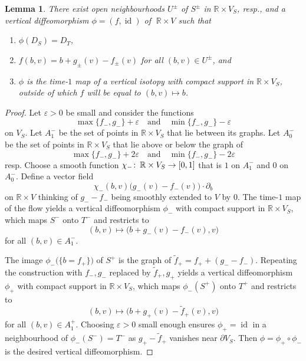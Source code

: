 \documentclass{amsart}
\newtheorem{lem}[prop]{Lemma}
\theoremstyle{definition}
\def\co{\colon\thinspace}
\newcommand{\R}{\mathbb R}
\newcommand{\ra}{\rightarrow}
\DeclareMathOperator{\id}{\mathrm{id}}
\begin{document}
\begin{lem}
\label{lem:verticallydiffeomorphic}
  There exist open neighbourhoods $U^{\pm}\!$ of
  $S^{\pm}$ in $\R\times V_S$, resp.,
  and a vertical diffeomorphism $\phi=(f,\id)$ of
  $\;\R\times V$
  such that
  	\begin{enumerate}
 	\item[(i)]
  		$\phi(D_S)=D_T$,
 	\item[(ii)]
		$f(b,v)=b+g_{\pm}(v)-f_{\pm}(v)$
		for all $(b,v)\in U^{\pm}$, and
 	\item[(iii)]
		$\phi$ is the time-$1$ map of a vertical isotopy
		with compact support in $\R\times V_S$,
		outside of which $f$ will be equal to $(b,v)\mapsto b$.
  	\end{enumerate}
\end{lem}


\begin{proof}
  Let $\varepsilon>0$ be small and consider the functions
  \[
  \max\{f_-,g_-\}+\varepsilon
  \quad\text{and}\quad
  \min\{f_-,g_-\}-\varepsilon
  \]
  on $V_S$.
  Let $A_1^-$ be the set of points in $\R\times V_S$
  that lie between its graphs.
  Let $A_0^-$ be the set of points in $\R\times V_S$
  that lie above or below the graph of
  \[
  \max\{f_-,g_-\}+2\varepsilon
  \quad\text{and}\quad
  \min\{f_-,g_-\}-2\varepsilon
  \]
  resp.
  Choose a smooth function $\chi_-\co\R\times V_S\ra [0,1]$
  that is $1$ on $A_1^-$ and $0$ on $A_0^-$.
  Define a vector field
  \[
  \chi_-(b,v)
  \Big(g_-(v)-f_-(v)\Big)
  \cdot\partial_b
  \]
  on $\R\times V$ thinking of $g_--f_-$ being smoothly extended
  to $V$ by $0$.
  The time-$1$ map of the flow
  yields a vertical diffeomorphism $\phi_-$
  with compact support in $\R\times V_S$,
  which maps $S^-$ onto $T^-$ and restricts to
  \[
  (b,v)\longmapsto\Big(b+g_-(v)-f_-(v),v\Big)
  \]
  for all $(b,v)\in A_1^-$.
  
  The image $\phi_-\big(\{b=f_+\}\big)$ of $S^+$ is the graph of
  $\tilde{f}_+=f_++(g_--f_-)$.
  Repeating the construction with $f_-,g_-$ replaced by $\tilde{f}_+,g_+$
  yields a vertical diffeomorphism $\phi_+$
  with compact support in $\R\times V_S$,
  which maps $\phi_-(S^+)$ onto $T^+$ and restricts to
  \[
  (b,v)\longmapsto\Big(b+g_+(v)-\tilde{f}_+(v),v\Big)
  \]
  for all $(b,v)\in A_1^+$.
  Choosing $\varepsilon>0$ small enough
  ensures $\phi_+=\id$ in a neighbourhood of $\phi_-(S^-)=T^-$
  as $g_+-\tilde{f}_+$ vanishes near $\partial V_S$.
  Then $\phi=\phi_+\circ\phi_-$
  is the desired vertical diffeomorphism.
\end{proof}
\end{document}
